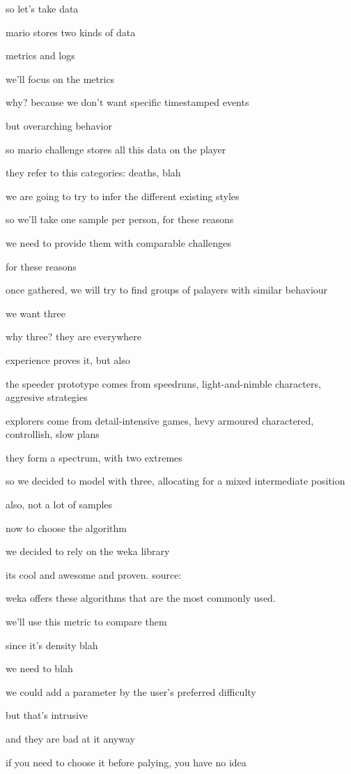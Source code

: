 \documentclass[conference]{IEEEtran}
\begin{document}
so let's take data

mario stores two kinds of data

metrics and logs

we'll focus on the metrics

why? because we don't want specific timestamped events

but overarching behavior

so mario challenge stores all this data on the player

they refer to this categories: deaths, blah

we are going to try to infer the different existing styles

so we'll take one sample per person, for these reasons

we need to provide them with comparable challenges

for these reasons

once gathered, we will try to find groups of palayers with similar behaviour

we want three

why three? they are everywhere

experience proves it, but also

the speeder prototype comes from speedruns, light-and-nimble characters, aggresive strategies

explorers come from detail-intensive games, hevy armoured charactered, controllish, slow plans

they form a spectrum, with two extremes

so we decided to model with three, allocating for a mixed intermediate position

also, not a lot of samples

now to choose the algorithm

we decided to rely on the weka library

its cool and awesome and proven. source:

weka offers these algorithms that are the most commonly used.

we'll use this metric to compare them

since it's density blah

we need to blah

we could add a parameter by the user's preferred difficulty

but that's intrusive

and they are bad at it anyway

if you need to choose it before palying, you have no idea
\end{document}

